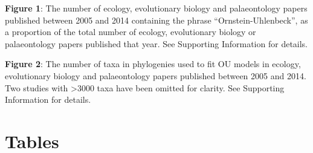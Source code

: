 \documentclass[a4paper,12pt]{article}
\begin{document}
\noindent
\textbf{Figure 1}: The number of ecology, evolutionary biology and palaeontology papers published between 2005 and 2014 containing the phrase ``Ornstein-Uhlenbeck'', as a proportion of the total number of ecology, evolutionary biology or palaeontology papers published that year. See Supporting Information for details.

\noindent
\textbf{Figure 2}: The number of taxa in phylogenies used to fit OU models in ecology, evolutionary biology and palaeontology papers published between 2005 and 2014. Two studies with \textgreater 3000 taxa have been omitted for clarity. See Supporting Information for details.

\newpage
\section{Tables}
\end{document}

